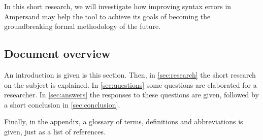 In this short research, we will investigate how improving syntax errors in Ampersand may help the tool to achieve its goals of becoming the groundbreaking formal methodology of the future.

\subsection{Document overview}
An introduction is given is this section.
Then, in \autoref{sec:research} the short research on the subject is explained.
In \autoref{sec:questions} some questions are elaborated for a researcher.
In \autoref{sec:answers} the responses to these questions are given, followed by a short conclusion in \autoref{sec:conclusion}.

Finally, in the appendix, a glossary of terms, definitions and abbreviations is given, just as a list of references.
